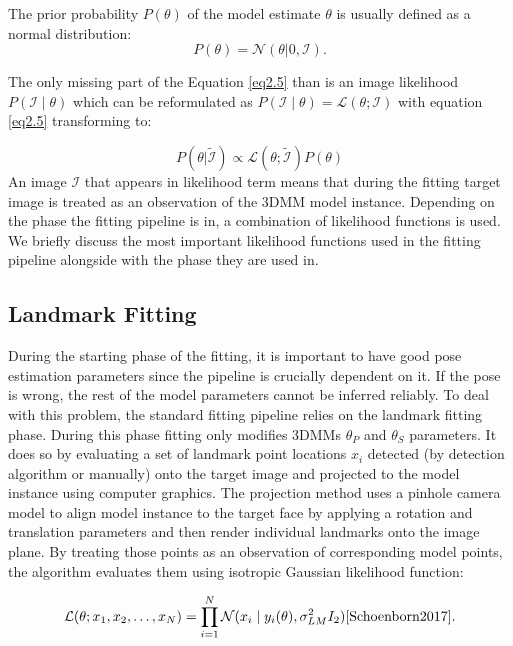 The prior probability $P(\theta)$ of the model estimate $\theta$ is usually defined as a normal distribution: 
\begin{equation}
    \label{eq3}
    P(\theta) = \mathcal N(\theta | 0, \mathcal I).
\end{equation}

The only missing part of the Equation \ref{eq2.5} than is an image likelihood $P(\mathcal{I}\mid\theta)$ which can be reformulated as $P(\mathcal{I}\mid\theta) = \mathcal{L}(\theta;\mathcal{I})$ with equation \ref{eq2.5} transforming to:

\begin{equation}
    \label{eq2.5}
    P(\theta | \tilde{\mathcal I}) \propto \mathcal L(\theta;\tilde{\mathcal I})P(\theta)
\end{equation} 
An image $\mathcal{I}$ that appears in likelihood term means that during the fitting target image is treated as an observation of the 3DMM model instance.
Depending on the phase the fitting pipeline is in, a combination of likelihood functions is used. We briefly discuss the most important likelihood functions used in the fitting pipeline alongside with the phase they are used in.   

\subsection{Landmark Fitting}
During the starting phase of the fitting, it is important to have good pose estimation parameters since the pipeline is crucially dependent on it. If the pose is wrong, the rest of the model parameters cannot be inferred reliably. To deal with this problem, the standard fitting pipeline relies on the landmark fitting phase. During this phase fitting only modifies 3DMMs $\theta_P$ and $\theta_S$ parameters. It does so by evaluating a set of landmark point locations $x_i$ detected (by detection algorithm or manually) onto the target image and projected to the model instance using computer graphics. The projection method uses a pinhole camera model to align model instance to the target face by applying a rotation and translation parameters and then render individual landmarks onto the image plane. By treating those points as an observation of corresponding model points, the algorithm evaluates them using isotropic Gaussian likelihood function: 

\begin{equation}
\mathcal L(\theta; x_1, x_2,\dots, x_N) = \prod_{i=1}^{N} \mathcal N(x_i\mid y_i(\theta), \sigma^2_{LM} I_2) \text{\cite{Schoenborn2017}}.
\label{lmeval}
\end{equation}

